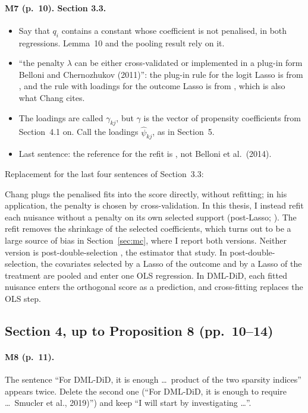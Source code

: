 \documentclass[11pt]{article}
\newenvironment{ins}{\begin{leftbar}}{\end{leftbar}}
\theoremstyle{plain}
\theoremstyle{remark}
\begin{document}
\paragraph{M7 (p.~10). Section 3.3.}
\begin{itemize}
\item Say that $q_i$ contains a constant whose coefficient is not penalised, in
  both regressions. Lemma~10 and the pooling result rely on it.
\item ``the penalty $\lambda$ can be either cross-validated or implemented in a
  plug-in form Belloni and Chernozhukov (2011)'': the plug-in rule for the logit
  Lasso is from \textcite{belloni2016post}, and the rule with loadings for the
  outcome Lasso is from \textcite{belloni2012sparse}, which is also what Chang
  cites.
\item The loadings are called $\gamma_{kj}$, but $\gamma$ is the vector of
  propensity coefficients from Section~4.1 on. Call the loadings
  $\hat\psi_{kj}$, as in Section~5.
\item Last sentence: the reference for the refit is
  \textcite{belloni2013least}, not Belloni et al.\ (2014).
\end{itemize}
Replacement for the last four sentences of Section~3.3:
\begin{ins}
Chang plugs the penalised fits into the score directly, without refitting; in
his application, the penalty is chosen by cross-validation. In this thesis, I
instead refit each nuisance without a penalty on its own selected support
(post-Lasso; \cite{belloni2013least}). The refit removes the shrinkage of the
selected coefficients, which turns out to be a large source of bias in
Section~\ref{sec:mc}, where I report both versions. Neither version is
post-double-selection \parencite{belloni2014inference}, the estimator that
\textcite{kolesar2026fragility} study. In post-double-selection, the covariates
selected by a Lasso of the outcome and by a Lasso of the treatment are pooled and
enter one OLS regression. In DML-DiD, each fitted nuisance enters the orthogonal
score as a prediction, and cross-fitting replaces the OLS step.
\end{ins}

\subsection{Section 4, up to Proposition 8 (pp.~10--14)}

\paragraph{M8 (p.~11).} The sentence ``For DML-DiD, it is enough \dots\ product of
the two sparsity indices'' appears twice. Delete the second one (``For DML-DiD,
it is enough to require \dots\ Smucler et al., 2019)'') and keep ``I will start by
investigating \dots''.
\end{document}

